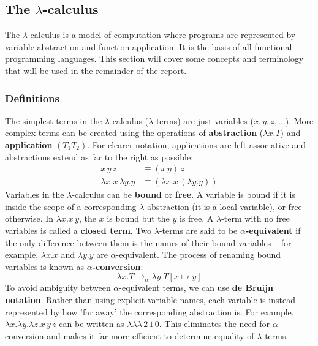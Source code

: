 \documentclass[12pt]{article}
\begin{document}
\subsection{The \texorpdfstring{$\lambda$}{lambda}-calculus}
The $\lambda$-calculus is a model of computation where programs are represented by variable abstraction and function application. It is the basis of all functional programming languages. This section will cover some concepts and terminology that will be used in the remainder of the report.

\subsubsection{Definitions}
\label{sec:defs}

The simplest terms in the $\lambda$-calculus ($\lambda$-terms) are just variables ($x, y, z, ...$). More complex terms can be created using the operations of \textbf{abstraction} ($\lambda x. T$) and \textbf{application} $(T_1 T_2)$. For clearer notation, applications are left-associative and abstractions extend as far to the right as possible:
%
\begin{align*}
    x \, y \, z &\equiv (x \, y) \, z \\
    \lambda x. x \, \lambda y. y &\equiv (\lambda x. x \, (\lambda y. y))
\end{align*}
%
Variables in the $\lambda$-calculus can be \textbf{bound} or \textbf{free}. A variable is bound if it is inside the scope of a corresponding $\lambda$-abstraction (it is a local variable), or free otherwise. In $\lambda x. x \, y$, the $x$ is bound but the $y$ is free. A $\lambda$-term with no free variables is called a \textbf{closed term}. Two $\lambda$-terms are said to be \textbf{$\alpha$-equivalent} if the only difference between them is the names of their bound variables -- for example, $\lambda x. x$ and $\lambda y. y$ are $\alpha$-equivalent. The process of renaming bound variables is known as \textbf{$\alpha$-conversion}:
%
$$\lambda x. T \to_\alpha \lambda y. T[x \mapsto y]$$
%
To avoid ambiguity between $\alpha$-equivalent terms, we can use \textbf{de Bruijn notation}. Rather than using explicit variable names, each variable is instead represented by how 'far away' the corresponding abstraction is. For example, $\lambda x. \lambda y. \lambda z. x \, y \, z$ can be written as $\lambda\lambda\lambda \, 2 \, 1 \, 0$. This eliminates the need for $\alpha$-conversion and makes it far more efficient to determine equality of $\lambda$-terms.
\end{document}
